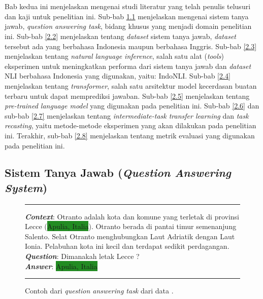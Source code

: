 \chapter{\babDua}
\label{bab:2}
Bab kedua ini menjelaskan mengenai studi literatur yang telah penulis telusuri dan kaji untuk penelitian ini. Sub-bab \ref{2.1} menjelaskan mengenai sistem tanya jawab, \emph{question answering task}, bidang khusus yang menjadi domain penelitian ini. Sub-bab \ref{2.2} menjelaskan tentang \emph{dataset} sistem tanya jawab, \emph{dataset} tersebut ada yang berbahasa Indonesia maupun berbahasa Inggris. Sub-bab \ref{2.3} menjelaskan tentang \emph{natural language inference}, salah satu alat (\emph{tools}) eksperimen untuk meningkatkan performa dari sistem tanya jawab dan \emph{dataset} NLI berbahasa Indonesia yang digunakan, yaitu: IndoNLI. Sub-bab \ref{2.4} menjelaskan tentang \emph{transformer}, salah satu arsitektur model kecerdasan buatan terbaru untuk dapat memprediksi jawaban. Sub-bab \ref{2.5} menjelaskan tentang \emph{pre-trained language model} yang digunakan pada penelitian ini. Sub-bab \ref{2.6} dan sub-bab \ref{2.7} menjelaskan tentang \emph{intermediate-task transfer learning} dan \emph{task recasting}, yaitu metode-metode eksperimen yang akan dilakukan pada penelitian ini. Terakhir, sub-bab \ref{2.8} menjelaskan tentang metrik evaluasi yang digunakan pada penelitian ini.

\section{Sistem Tanya Jawab (\emph{Question Answering System})}
\label{2.1}

\begin{figure}[h]
\vspace{3pt}
\hrule
\vspace{3pt}

\textbf{\emph{Context}}: Otranto adalah kota dan komune yang terletak di  \colorbox{BurntOrange}{provinsi Lecce} (\colorbox{ForestGreen}{Apulia, Italia}). Otranto berada di pantai timur semenanjung Salento. Selat Otranto menghubungkan Laut Adriatik dengan Laut Ionia. Pelabuhan kota ini kecil dan terdapat sedikit perdagangan.\\

\textbf{\emph{Question}}: \colorbox{BurntOrange}{Dimanakah letak Lecce ?}\\

\textbf{\emph{Answer}}:  \colorbox{ForestGreen}{Apulia, Italia}

\vspace{3pt}
\hrule
\vspace{3pt}
\centering
\caption{Contoh dari \emph{question answering task} dari data \citep{putri-oh-2022-idk}.}
\end{figure}

